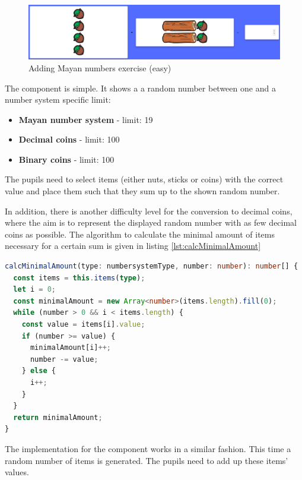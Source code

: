 \begin{figure} 
  \centering
  \includegraphics[width=1.0 \columnwidth]{figures/mayas_addition.png}
  \caption{Adding Mayan numbers exercise (easy)} 
  \label{fig:mayanAddition} 
\end{figure}

The  component is simple. It shows a a random number between one and a number system specific limit:

\begin{itemize}
  \item \textbf{Mayan number system} - limit: 19
  \item \textbf{Decimal coins} - limit: 100
  \item \textbf{Binary coins} - limit: 100
\end{itemize}

The pupils need to select items (either nuts, sticks or coins) with the correct value and place them such that they sum up to the shown random number.

In addition, there is another difficulty level for the conversion to decimal coins, where the aim is to represent the displayed random number with as few decimal coins as possible. The algorithm to calculate the minimal amount of items necessary for a certain sum is given in listing \ref{lst:calcMinimalAmount} 


\begin{lstlisting}[language=TypeScript,caption={Calculate minimal amount of items needed to reach a certain number},label={lst:calcMinimalAmount}]
calcMinimalAmount(type: numbersystemType, number: number): number[] {
  const items = this.items(type);
  let i = 0;
  const minimalAmount = new Array<number>(items.length).fill(0);
  while (number > 0 && i < items.length) {
    const value = items[i].value;
    if (number >= value) {
      minimalAmount[i]++;
      number -= value;
    } else {
      i++;
    }
  }
  return minimalAmount;
}
\end{lstlisting}

The implementation for the  component works in a similar fashion. This time a random number of items is generated. The pupils need to add up these items' values.

